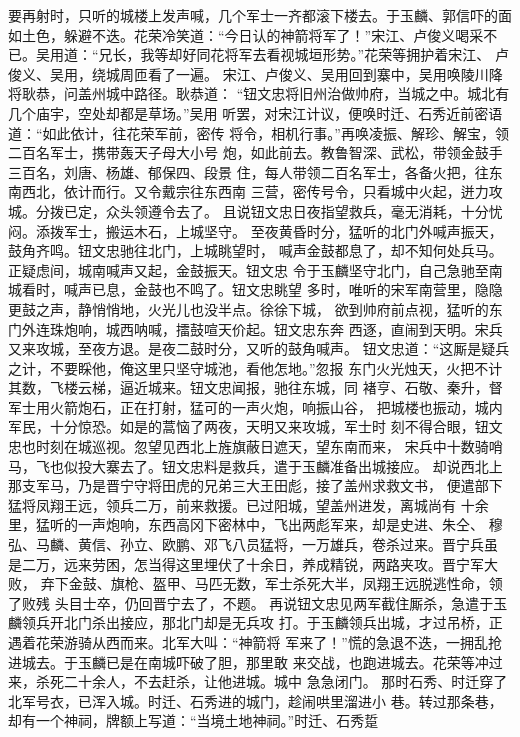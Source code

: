要再射时，只听的城楼上发声喊，几个军士一齐都滚下楼去。于玉麟、郭信吓的面
如土色，躲避不迭。花荣冷笑道：“今日认的神箭将军了！”宋江、卢俊义喝采不
已。吴用道：“兄长，我等却好同花将军去看视城垣形势。”花荣等拥护着宋江、
卢俊义、吴用，绕城周匝看了一遍。
宋江、卢俊义、吴用回到寨中，吴用唤陵川降将耿恭，问盖州城中路径。耿恭道：
“钮文忠将旧州治做帅府，当城之中。城北有几个庙宇，空处却都是草场。”吴用
听罢，对宋江计议，便唤时迁、石秀近前密语道：“如此依计，往花荣军前，密传
将令，相机行事。”再唤凌振、解珍、解宝，领二百名军士，携带轰天子母大小号
炮，如此前去。教鲁智深、武松，带领金鼓手三百名，刘唐、杨雄、郁保四、段景
住，每人带领二百名军士，各备火把，往东南西北，依计而行。又令戴宗往东西南
三营，密传号令，只看城中火起，迸力攻城。分拨已定，众头领遵令去了。
且说钮文忠日夜指望救兵，毫无消耗，十分忧闷。添拨军士，搬运木石，上城坚守。
至夜黄昏时分，猛听的北门外喊声振天，鼓角齐鸣。钮文忠驰往北门，上城眺望时，
喊声金鼓都息了，却不知何处兵马。正疑虑间，城南喊声又起，金鼓振天。钮文忠
令于玉麟坚守北门，自己急驰至南城看时，喊声已息，金鼓也不鸣了。钮文忠眺望
多时，唯听的宋军南营里，隐隐更鼓之声，静悄悄地，火光儿也没半点。徐徐下城，
欲到帅府前点视，猛听的东门外连珠炮响，城西呐喊，擂鼓喧天价起。钮文忠东奔
西逐，直闹到天明。宋兵又来攻城，至夜方退。是夜二鼓时分，又听的鼓角喊声。
钮文忠道：“这厮是疑兵之计，不要睬他，俺这里只坚守城池，看他怎地。”忽报
东门火光烛天，火把不计其数，飞楼云梯，逼近城来。钮文忠闻报，驰往东城，同
褚亨、石敬、秦升，督军士用火箭炮石，正在打射，猛可的一声火炮，响振山谷，
把城楼也振动，城内军民，十分惊恐。如是的蒿恼了两夜，天明又来攻城，军士时
刻不得合眼，钮文忠也时刻在城巡视。忽望见西北上旌旗蔽日遮天，望东南而来，
宋兵中十数骑哨马，飞也似投大寨去了。钮文忠料是救兵，遣于玉麟准备出城接应。
却说西北上那支军马，乃是晋宁守将田虎的兄弟三大王田彪，接了盖州求救文书，
便遣部下猛将凤翔王远，领兵二万，前来救援。已过阳城，望盖州进发，离城尚有
十余里，猛听的一声炮响，东西高冈下密林中，飞出两彪军来，却是史进、朱仝、
穆弘、马麟、黄信、孙立、欧鹏、邓飞八员猛将，一万雄兵，卷杀过来。晋宁兵虽
是二万，远来劳困，怎当得这里埋伏了十余日，养成精锐，两路夹攻。晋宁军大败，
弃下金鼓、旗枪、盔甲、马匹无数，军士杀死大半，凤翔王远脱逃性命，领了败残
头目士卒，仍回晋宁去了，不题。
再说钮文忠见两军截住厮杀，急遣于玉麟领兵开北门杀出接应，那北门却是无兵攻
打。于玉麟领兵出城，才过吊桥，正遇着花荣游骑从西而来。北军大叫：“神箭将
军来了！”慌的急退不迭，一拥乱抢进城去。于玉麟已是在南城吓破了胆，那里敢
来交战，也跑进城去。花荣等冲过来，杀死二十余人，不去赶杀，让他进城。城中
急急闭门。
那时石秀、时迁穿了北军号衣，已浑入城。时迁、石秀进的城门，趁闹哄里溜进小
巷。转过那条巷，却有一个神祠，牌额上写道：“当境土地神祠。”时迁、石秀踅
